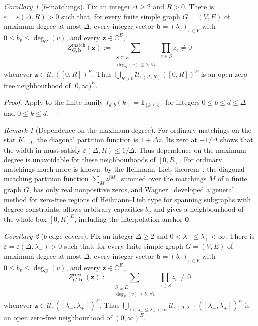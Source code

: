 \documentclass[11pt,reqno]{article}
\theoremstyle{plain}
\newtheorem{corollary}[theorem]{Corollary}
\theoremstyle{definition}
\theoremstyle{remark}
\newtheorem{remark}[theorem]{Remark}
\newtheorem{corollary}[corollary]{Corollary}
\theoremstyle{definition}
\theoremstyle{remark}
\newtheorem{remark}[remark]{Remark}
\newcommand{\C}{\mathbb{C}}
\newcommand{\eps}{\varepsilon}
\newcommand{\one}[1]{\mathbf{1}_{\left[#1\right]}}   %
\newcommand{\Deg}{\Delta}                        %
\begin{document}
\begin{corollary}[\(b\)-matchings]
\label{cor:bmatching-short}
Fix an integer \(\Deg\ge2\) and \(R>0\).  There is
\(\eps=\eps(\Deg,R)>0\) such that, for every finite simple graph \(G=(V,E)\) of
maximum degree at most \(\Deg\), every integer vector
\(\mathbf b=(b_v)_{v\in V}\) with \(0\le b_v\le\deg_G(v)\), and every
\(\mathbf z\in\C^E\),
\[
  Z^{\mathrm{match}}_{G,\mathbf b}(\mathbf z)
  :=\sum_{\substack{S\subseteq E\\
                    \deg_S(v)\le b_v\ \forall v}}
       \prod_{e\in S}z_e
  \ne0
\]
whenever \(\mathbf z\in\mathcal U_\eps([0,R])^E\).
Thus \(\bigcup_{R>0}\mathcal U_{\eps(\Deg,R)}([0,R])^E\)
is an open zero-free neighbourhood of \([0,\infty)^E\).
\end{corollary}

\begin{proof}
Apply  to the finite family
\(f_{d,b}(k)=\one{k\le b}\) for integers
\(0\le b\le d\le\Deg\) and \(0\le k\le d\).
\end{proof}

\begin{remark}[Dependence on the maximum degree]
\label{rem:matching-degree-dependence}
For ordinary matchings on the star \(K_{1,\Deg}\), the diagonal
partition function is \(1+\Deg z\).  Its zero at \(-1/\Deg\) shows
that the width in  must satisfy
\(\eps(\Deg,R)\le1/\Deg\).  Thus dependence on the maximum degree
is unavoidable for these neighbourhoods of \([0,R]\).  For ordinary
matchings much more is known: by the Heilmann--Lieb
theorem~\cite{HeilmannLieb1972}, the diagonal matching partition
function \(\sum_{M}z^{|M|}\), summed over the matchings \(M\) of a finite graph \(G\),
has only real nonpositive zeros, and Wagner~\cite{Wagner2009} developed a general
method for zero-free regions of Heilmann--Lieb type for spanning
subgraphs with degree constraints.   allows
arbitrary capacities \(b_v\) and gives a neighbourhood of the whole box
\([0,R]^E\), including the interpolation anchor \(\mathbf0\).
\end{remark}

\begin{corollary}[\(b\)-edge covers]
\label{cor:bcover-short}
Fix an integer \(\Deg\ge2\) and
\(0<\lambda_-\le\lambda_+<\infty\).  There is
\(\eps=\eps(\Deg,\lambda_-)>0\) such that, for every finite simple graph
\(G=(V,E)\) of maximum degree at most \(\Deg\), every integer vector
\(\mathbf b=(b_v)_{v\in V}\) with
\(0\le b_v\le\deg_G(v)\), and every \(\mathbf z\in\C^E\),
\[
  Z^{\mathrm{cover}}_{G,\mathbf b}(\mathbf z)
  :=\sum_{\substack{S\subseteq E\\
                    \deg_S(v)\ge b_v\ \forall v}}
       \prod_{e\in S}z_e
  \ne0
\]
whenever \(\mathbf z\in\mathcal U_\eps([\lambda_-,\lambda_+])^E\).
Thus
\(\bigcup_{0<\lambda_-\le\lambda_+<\infty}
  \mathcal U_{\eps(\Deg,\lambda_-)}([\lambda_-,\lambda_+])^E\)
is an open zero-free neighbourhood of \((0,\infty)^E\).
\end{corollary}
\end{document}
